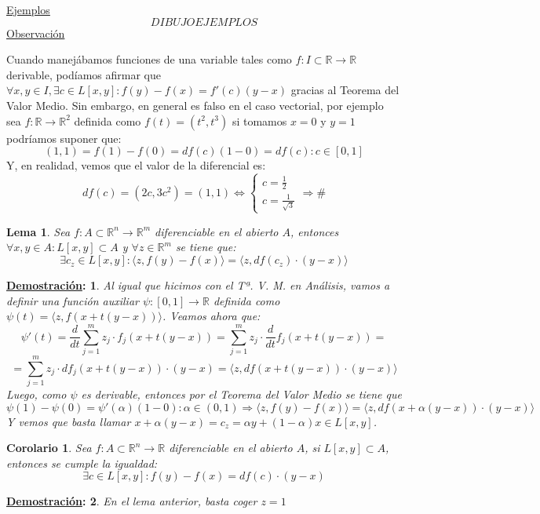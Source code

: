 \documentclass[10pt,a4paper,openright]{book}
\theoremstyle{break}
\newtheorem*{coro}{Corolario}
\newtheorem*{lema}{Lema}
\newtheorem*{demo}{\underline{Demostración}:}
\begin{document}
\underline{Ejemplos}
$$ DIBUJO EJEMPLOS$$
\underline{Observación}

Cuando manejábamos funciones de una variable tales como $f: I \subset \mathbb{R} \to \mathbb{R}$ derivable, podíamos afirmar que $\forall x,y \in I, \exists c \in L[x,y] : f(y) - f(x) = f'(c)(y-x)$ gracias al Teorema del Valor Medio. Sin embargo, en general es falso en el caso vectorial, por ejemplo sea $f: \mathbb{R} \to \mathbb{R}^2$ definida como $f(t)=(t^2, t^3)$ si tomamos $x = 0$ y $y=1$ podríamos suponer que:
$$(1,1) = f(1) - f(0) = df(c)(1-0) = df(c) : c \in [0,1]$$
Y, en realidad, vemos que el valor de la diferencial es:
$$df(c) = (2c,3c^2) = (1,1) \Leftrightarrow \begin{cases} c = \frac{1}{2} \\ c = \frac{1}{\sqrt{3}}\end{cases} \Rightarrow \#$$

\begin{lema}
Sea $f: A \subset \mathbb{R}^n \to \mathbb{R}^m$ diferenciable en el abierto $A$, entonces $\forall x,y \in A : L[x,y] \subset A$ y $\forall z \in \mathbb{R}^m$ se tiene que:
$$\exists c_z \in L [x,y] : \langle z, f(y) - f(x)\rangle = \langle z, df(c_z) \cdot (y-x) \rangle$$
\end{lema}
\begin{demo}
Al igual que hicimos con el Tª. V. M. en Análisis, vamos a definir una función auxiliar $\psi:[0,1] \to \mathbb{R}$ definida como $\psi(t) = \langle z, f(x+t(y-x)) \rangle$. Veamos ahora que:
$$\psi ' (t) = \frac{d}{dt}  \sum_{j=1}^{m} z_j \cdot f_j (x + t(y-x)) = \sum_{j=1}^{m} z_j \cdot \frac{d}{dt} f_j (x + t(y-x)) =$$
$$= \sum_{j=1}^{m} z_j \cdot d f_j (x + t(y-x)) \cdot (y-x)= \langle z, df(x + t(y-x)) \cdot (y-x) \rangle$$
Luego, como $\psi$ es derivable, entonces por el Teorema del Valor Medio se tiene que
$$\psi (1) - \psi (0) = \psi'(\alpha) (1-0) : \alpha \in (0,1)\Rightarrow \langle z, f(y) - f(x)\rangle = \langle z, df(x + \alpha (y-x)) \cdot(y-x) \rangle$$
Y vemos que basta llamar $x + \alpha (y-x) = c_z = \alpha y + (1 - \alpha ) x \in L[x,y]$.
\end{demo}


\begin{coro}
Sea $f: A \subset \mathbb{R}^n \to \mathbb{R}$ diferenciable en el abierto $A$, si $L[x,y] \subset A$, entonces se cumple la igualdad:
$$\exists c \in L[x,y] : f(y) - f(x) = df(c) \cdot (y-x)$$
\end{coro}
\begin{demo}
En el lema anterior, basta coger $z = 1$
\end{demo}
\end{document}
